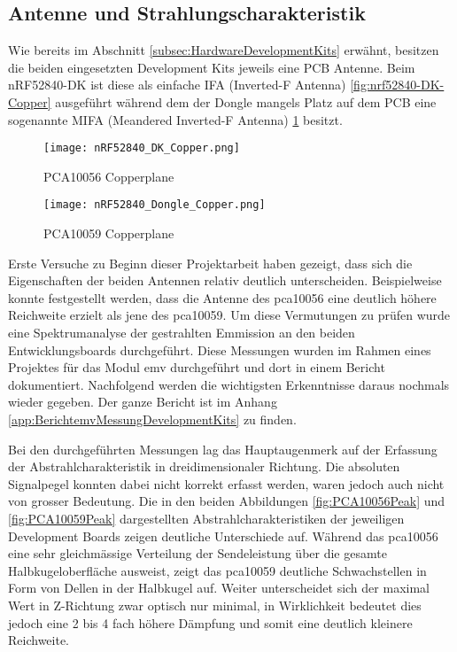 \subsection{Antenne und Strahlungscharakteristik}\label{subsec:AntenneundStrahlungscharakteristik}

Wie bereits im Abschnitt \ref{subsec:HardwareDevelopmentKits} erwähnt, besitzen die beiden eingesetzten Development Kits jeweils eine PCB Antenne. Beim nRF52840-DK ist diese als einfache IFA (Inverted-F Antenna) \ref{fig:nrf52840-DK-Copper} ausgeführt während dem der Dongle mangels Platz auf dem PCB eine sogenannte MIFA (Meandered Inverted-F Antenna) \ref{fig:nrf52840-Dongle-Copper} besitzt.

\begin{figure}[!htbp]
\centering
\begin{minipage}[b]{0.49\textwidth}
		\centering
		\texttt{[image: nRF52840\_DK\_Copper.png]}
		\caption[PCA10056 Copperplane mit IFA-Antenne]{PCA10056 Copperplane \cite{nordic_semiconductor_asa_pca10056_schematic_and_pcb_2019}}
		\label{fig:nrf52840-DK-Copper}
\end{minipage}
\begin{minipage}[b]{0.49\textwidth}
		\centering
		\texttt{[image: nRF52840\_Dongle\_Copper.png]}
		\caption[PCA10059 Copperplane mit MIFA-Antenne]{PCA10059 Copperplane \cite{nordic_semiconductor_asa_pca10059_schematic_and_pcb_2020}}
		\label{fig:nrf52840-Dongle-Copper}
\end{minipage}
\end{figure}

Erste Versuche zu Beginn dieser Projektarbeit haben gezeigt, dass sich die Eigenschaften der beiden Antennen relativ deutlich unterscheiden. Beispielweise konnte festgestellt werden, dass die Antenne des pca10056 eine deutlich höhere Reichweite erzielt als jene des pca10059.
Um diese Vermutungen zu prüfen wurde eine Spektrumanalyse der gestrahlten Emmission an den beiden Entwicklungsboards durchgeführt. Diese Messungen wurden im Rahmen eines Projektes für das Modul emv durchgeführt und dort in einem Bericht dokumentiert. Nachfolgend werden die wichtigsten Erkenntnisse daraus nochmals wieder gegeben. Der ganze Bericht ist im Anhang \ref{app:BerichtemvMessungDevelopmentKits} zu finden.

Bei den durchgeführten Messungen lag das Hauptaugenmerk auf der Erfassung der Abstrahlcharakteristik in dreidimensionaler Richtung. Die absoluten Signalpegel konnten dabei nicht korrekt erfasst werden, waren jedoch auch nicht von grosser Bedeutung.
Die in den beiden Abbildungen \ref{fig:PCA10056Peak} und \ref{fig:PCA10059Peak} dargestellten Abstrahlcharakteristiken der jeweiligen Development Boards zeigen deutliche Unterschiede auf. Während das pca10056 eine sehr gleichmässige Verteilung der Sendeleistung über die gesamte Halbkugeloberfläche ausweist, zeigt das pca10059 deutliche Schwachstellen in Form von Dellen in der Halbkugel auf.
Weiter unterscheidet sich der maximal Wert in Z-Richtung zwar optisch nur minimal, in Wirklichkeit bedeutet dies jedoch eine 2 bis 4 fach höhere Dämpfung und somit eine deutlich kleinere Reichweite.



